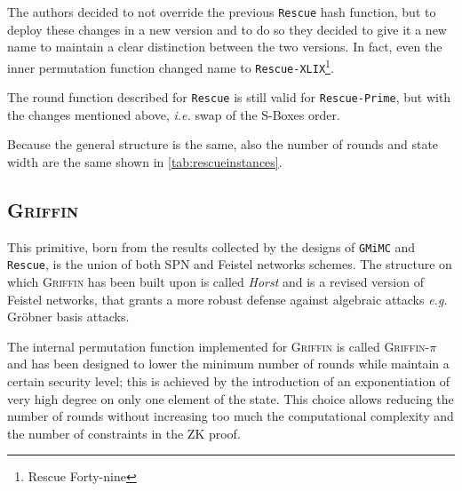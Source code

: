 \documentclass[12pt, a4paper]{report}
\begin{document}
The authors decided to not override the previous \texttt{Rescue} hash function, but to deploy these changes in a new version and to do so they decided to give it a new name to maintain a clear distinction between the two versions.
In fact, even the inner permutation function changed name to \texttt{Rescue-XLIX}\footnote{Rescue Forty-nine}.

The round function described for \texttt{Rescue} is still valid for \texttt{Rescue-Prime}, but with the changes mentioned above, \textsl{i.e.} swap of the S-Boxes order.

Because the general structure is the same, also the number of rounds and state width are the same shown in \autoref{tab:rescueinstances}.

\subsection{\textsc{Griffin}}\label{subsec:griffin}

This primitive, born from the results collected by the designs of \texttt{GMiMC} and \texttt{Rescue}, is the union of both SPN and Feistel networks schemes.
The structure on which \textsc{Griffin} has been built upon is called \textit{Horst} and is a revised version of Feistel networks, that grants a more robust defense against algebraic attacks \textsl{e.g.} Gr\"obner basis attacks.

The internal permutation function implemented for \textsc{Griffin} is called \textsc{Griffin-$\pi$} and has been designed to lower the minimum number of rounds while maintain a certain security level; this is achieved by the introduction of an exponentiation of very high degree on only one element of the state. This choice allows reducing the number of rounds without increasing too much the computational complexity and the number of constraints in the ZK proof.
\end{document}
